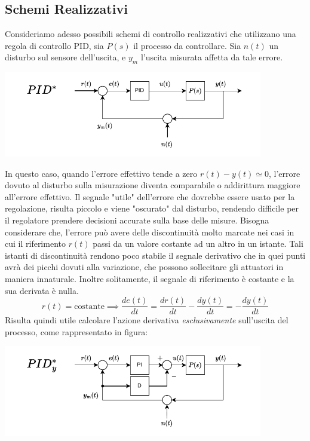 \documentclass[10pt, letterpaper]{report}
\begin{document}
\subsection{Schemi Realizzativi}
Consideriamo adesso possibili schemi di controllo realizzativi che utilizzano una regola di controllo PID, sia $P(s)$ il processo da controllare. Sia $n(t)$ un disturbo sul sensore dell'uscita, e $y_m$ l'uscita misurata affetta da tale errore.
\begin{center}
    \includegraphics[width=0.85\textwidth]{images/schemaDiControlloPID.pdf}
\end{center}
In questo caso, quando l'errore effettivo tende a zero $r(t)-y(t)\simeq 0$, l'errore dovuto al disturbo sulla misurazione diventa comparabile o addirittura maggiore all'errore effettivo.\acc  
Il segnale "utile" dell'errore che dovrebbe essere usato per la regolazione, risulta piccolo e viene "oscurato" dal disturbo, rendendo difficile per il regolatore prendere decisioni accurate sulla base delle misure.\acc 
Bisogna considerare che, l'errore può avere delle discontinuità molto marcate nei casi in cui il riferimento $r(t)$ passi da un valore costante ad un altro in un istante. Tali istanti di discontinuità rendono poco stabile il segnale derivativo che in quei punti avrà dei picchi dovuti alla variazione, che possono sollecitare gli attuatori in maniera innaturale. Inoltre solitamente, il segnale di riferimento è costante e la sua derivata è nulla. 
$$ 
r(t)=\text{costante}\implies
\frac{de(t)}{dt}=\frac{dr(t)}{dt}-\frac{dy(t)}{dt}=-\frac{dy(t)}{dt}
$$ 
Risulta quindi utile calcolare l'azione derivativa \textit{esclusivamente} sull'uscita del processo, come rappresentato in figura:
\begin{center}
    \includegraphics[width=0.85\textwidth]{images/schemaPIDderivataUscita.pdf}
\end{center}
\end{document}
